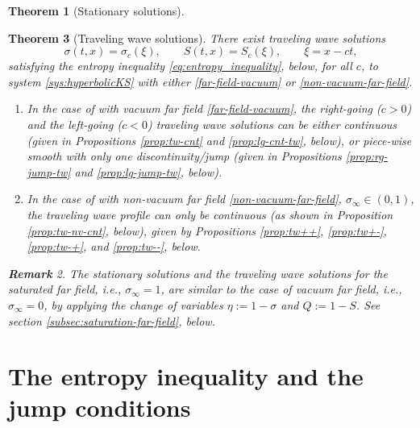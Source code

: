 \documentclass[12pt]{article}
\newtheorem{theorem}{Theorem}[section]
\theoremstyle{definition}
\theoremstyle{remark}
\newtheorem{remark}[theorem]{{\bf Remark}}
\numberwithin{equation}{section}
\begin{document}
\begin{theorem}[Stationary solutions]
\begin{enumerate}
\end{enumerate}
\end{theorem}

\begin{theorem}[Traveling wave solutions]
\label{thm:tvl-sol}
There exist traveling wave solutions
\begin{equation}
    \sigma(t,x)=\sigma_c(\xi),
    \qquad
    S(t,x)=S_c(\xi),
    \qquad
    \xi=x-ct,
\end{equation}
satisfying the entropy inequality \eqref{eq:entropy_inequality}, below, for all $ c $, to system \eqref{sys:hyperbolicKS} with either \eqref{far-field-vacuum} or \eqref{non-vacuum-far-field}. 
\begin{enumerate}
\item 
In the case of with vacuum far field \eqref{far-field-vacuum}, the right-going ($c > 0$) and the left-going ($ c< 0 $) traveling wave solutions can be either continuous (given in Propositions \ref{prop:tw-cnt} and \ref{prop:lg-cnt-tw}, below), or piece-wise smooth with only one discontinuity/jump (given in Propositions \ref{prop:rg-jump-tw} and \ref{prop:lg-jump-tw}, below). 
    \item In the case of with non-vacuum far field \eqref{non-vacuum-far-field}, $ \sigma_\infty \in (0,1) $, the traveling wave profile can only be continuous (as shown in Proposition \ref{prop:tw-nv-cnt}, below), given by Propositions \ref{prop:tw++}, \ref{prop:tw+-}, \ref{prop:tw-+}, and \ref{prop:tw--}, below. 
\end{enumerate}
\begin{remark}
\label{remark:thm}
    The stationary solutions and the traveling wave solutions for the saturated far field, i.e., $ \sigma_\infty = 1 $, are similar to the case of vacuum far field, i.e., $ \sigma_\infty = 0 $, by applying the change of variables $ \eta := 1-\sigma $ and $ Q:= 1-S $. See section \ref{subsec:saturation-far-field}, below.
\end{remark}

    
\end{theorem}

\section{The entropy inequality and the jump conditions}
\label{sec:entropy}
\end{document}
